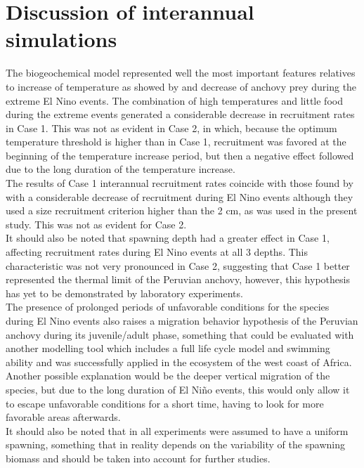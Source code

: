 \clearpage
\section{Discussion of interannual simulations}\label{Chap3Disc2}

The biogeochemical model represented well the most important features relatives to increase of temperature as showed by \citep{ColaCape2008} and decrease of anchovy prey \citep{AyonSwar2011} during the extreme El Nino events. The combination of high temperatures and little food during the extreme events generated a considerable decrease in recruitment rates in Case 1. This was not as evident in Case 2, in which, because the optimum temperature threshold is higher than in Case 1, recruitment was favored at the beginning of the temperature increase period, but then a negative effect followed due to the long duration of the temperature increase.\\

The results of Case 1 interannual recruitment rates coincide with those found by \cite{XuChai2013} with a considerable decrease of recruitment during El Nino events although they used a size recruitment criterion higher than the 2 cm, as was used in the present study. This was not as evident for Case 2.\\

It should also be noted that spawning depth had a greater effect in Case 1, affecting recruitment rates during El Nino events at all 3 depths. This characteristic was not very pronounced in Case 2, suggesting that Case 1 better represented the thermal limit of the Peruvian anchovy, however, this hypothesis has yet to be demonstrated by laboratory experiments.\\

The presence of prolonged periods of unfavorable conditions for the species during El Nino events also raises a migration behavior hypothesis of the Peruvian anchovy during its juvenile/adult phase, something that could be evaluated with another modelling tool \citep{BrocAuge2018} which includes a full life cycle model and swimming ability and was successfully applied in the ecosystem of the west coast of Africa. Another possible explanation would be the deeper vertical migration of the species, but due to the long duration of El Niño events, this would only allow it to escape unfavorable conditions for a short time, having to look for more favorable areas afterwards.\\

It should also be noted that in all experiments were assumed to have a uniform spawning, something that in reality depends on the variability of the spawning biomass \citep{CahuCubi2009} and should be taken into account for further studies.

\clearpage
